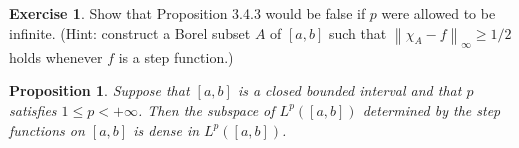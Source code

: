 \documentclass[11pt,a4paper,twoside]{article}
\theoremstyle{definition}
\newcounter{excounter}
\newtheorem{exercise}[excounter]{Exercise}
\theoremstyle{plain}
\newtheorem{proposition}{Proposition}[subsection]
\begin{document}
\begin{exercise}

  Show that Proposition 3.4.3 would be false if $p$ were allowed to be infinite. (Hint: construct a
  Borel subset $A$ of $[ a, b ]$ such that $\left\| \chi_A - f \right\|_\infty \geq 1 / 2$ holds whenever
  $f$ is a step function.)

\end{exercise}

\begin{proposition}

  Suppose that $[ a, b ]$ is a closed bounded interval and that $p$ satisfies $1 \leq p < +\infty$.
  Then the subspace of $L^p ( [ a, b ])$ determined by the step functions on $[ a, b ]$ is dense in $L^p ( [ a, b ] )$.

\end{proposition}
\end{document}
